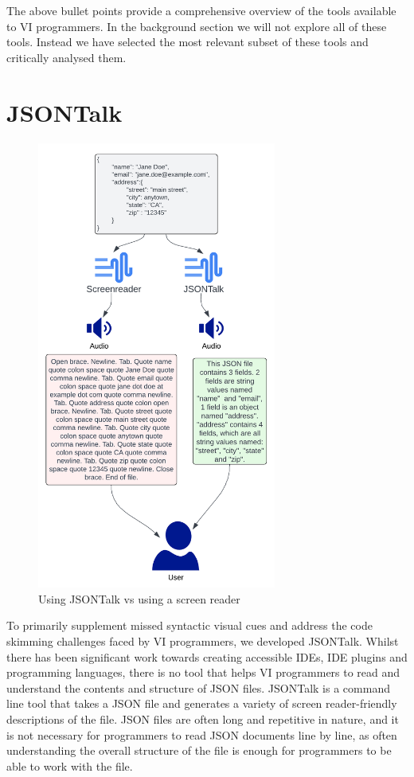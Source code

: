 \documentclass{l4proj}
\begin{document}
The above bullet points provide a comprehensive overview of the tools available to VI programmers. In the background section we will not explore all of these tools. Instead we have selected the most relevant subset of these tools and critically analysed them.

\section{JSONTalk}

\begin{figure}
    \centering
    \includegraphics[width=0.7\textwidth]{dissertation/images/JSONTalk updated.png}
    \caption{Using JSONTalk vs using a screen reader }
    \label{fig:JSONTalk_use_case}
\end{figure}


To primarily supplement missed syntactic visual cues and address the code skimming challenges faced by VI programmers, we developed JSONTalk. Whilst there has been significant work towards creating accessible IDEs, IDE plugins and programming languages, there is no tool that helps VI programmers to read and understand the contents and structure of JSON files. JSONTalk is a command line tool that takes a JSON file and generates a variety of screen reader-friendly descriptions of the file. JSON files are often long and repetitive in nature, and it is not necessary for programmers to read JSON documents line by line, as often understanding the overall structure of the file is enough for programmers to be able to work with the file.
\end{document}

